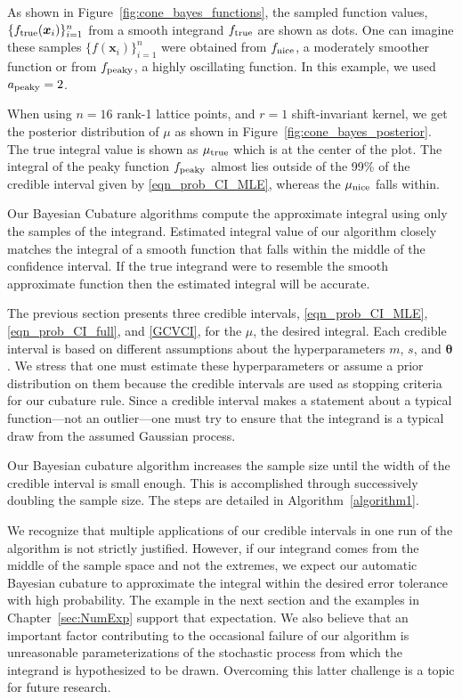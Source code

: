 \documentclass{iitthesis}          %
\newcommand{\bm}[1]{\boldsymbol{#1}}
\newcommand{\vtheta}{{\bm{\theta}}}
\newcommand{\vx}{\bm{x}}
\newcommand{\NICE}{\textup{nice}}
\newcommand{\PEAKY}{\textup{peaky}}
\newcommand{\TRUE}{\textup{true}}
\newcommand\figref{Figure~\ref}
\begin{document}
As shown in \figref{fig:cone_bayes_functions}, the sampled function values, $\{f_{\TRUE}(\vx_i)\}_{i=1}^n$ from a smooth integrand $f_{\TRUE}$ are shown as dots. One can imagine these samples $\{f(\vx_i)\}_{i=1}^n$ were obtained from $f_{\NICE}$, a moderately smoother function or from $f_{\PEAKY}$, a highly oscillating function. In this example, we used $a_{\PEAKY} = 2$.

When using $n=16$ rank-1 lattice points, and $r=1$ shift-invariant kernel, we get the posterior distribution of $\mu$ as shown in \figref{fig:cone_bayes_posterior}. The true integral value is shown as $\mu_{\TRUE}$ which is at the center of the plot. The integral of the peaky function $f_{\PEAKY}$ almost lies outside of the 99\% of the credible interval given by \eqref{eqn_prob_CI_MLE}, whereas the $\mu_{\NICE}$ falls within.

Our Bayesian Cubature algorithms compute the approximate integral using only the samples of the integrand. 
Estimated integral value of our algorithm closely matches the integral of a smooth function that falls within the middle of the confidence interval. If the true integrand were to resemble the smooth approximate function then the estimated integral will be accurate.  



\label{sec:bayes_cubature_algo}

The previous section presents three credible intervals, \eqref{eqn_prob_CI_MLE}, \eqref{eqn_prob_CI_full}, and \eqref{GCVCI}, for the $\mu$, the desired integral.  Each credible interval is based on different assumptions about the hyperparameters $m$, $s$, and $\vtheta$.  We stress that one must estimate these hyperparameters or assume a prior distribution on them because the credible intervals are used as stopping criteria for our cubature rule.  Since a credible interval makes a statement about a typical function---not an outlier---one must try to ensure that the integrand is a typical draw from the assumed Gaussian process.

Our  Bayesian cubature algorithm increases the sample size until the width of the credible interval is small enough.  This is accomplished through successively doubling the sample size.  The steps are detailed in Algorithm~\ref{algorithm1}.

We recognize that multiple applications of our credible intervals in one run of the algorithm is not strictly justified.  However, if our integrand comes from the middle of the sample space and not the extremes, we expect our automatic Bayesian cubature to approximate the integral within the desired error tolerance with high probability.  The example in the next section and the examples in Chapter~\ref{sec:NumExp} support that expectation. We also believe that an important factor contributing to the occasional failure of our algorithm is unreasonable parameterizations of the stochastic process from which the integrand is hypothesized to be drawn.  Overcoming this latter challenge is a topic for future research.
\end{document}
